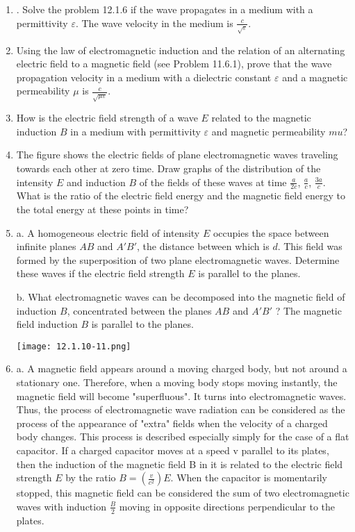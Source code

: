 \documentclass{article}
\begin{document}
\begin{enumerate}[label=12.1.\arabic*]
\item. Solve the problem 12.1.6 if the wave propagates in a medium with a permittivity $\varepsilon$. The wave velocity in the medium is $\frac{c}{\sqrt{\varepsilon}}$.

\item Using the law of electromagnetic induction and the relation of an alternating electric field to a magnetic field (see Problem 11.6.1), prove that the wave propagation velocity in a medium with a dielectric constant $\varepsilon$ and a magnetic permeability $\mu$ is $\frac{c}{\sqrt{\mu \varepsilon}}$.

\item How is the electric field strength of a wave $E$ related to the magnetic induction $B$ in a medium with permittivity $\varepsilon$ and magnetic permeability $mu$?

\item The figure shows the electric fields of plane electromagnetic waves traveling towards each other at zero time. Draw graphs of the distribution of the intensity $E$ and induction $B$ of the fields of these waves at time $\frac{a}{2c}$, $\frac{a}{c}$, $\frac{3a}{c}$. What is the ratio of the electric field energy and the magnetic field energy to the total energy at these points in time?

\item a. A homogeneous electric field of intensity $E$ occupies the space between infinite planes $AB$ and $A'B'$, the distance between which is $d$. This field was formed by the superposition of two plane electromagnetic waves. Determine these waves if the electric field strength $E$ is parallel to the planes.

b. What electromagnetic waves can be decomposed into the magnetic field of induction $B$, concentrated between the planes $AB$ and $A'B'$ ? The magnetic field induction $B$ is parallel to the planes.

\begin{center}
    \texttt{[image: 12.1.10-11.png]}
\end{center}


\item a. A magnetic field appears around a moving charged body, but not around a stationary one. Therefore, when a moving body stops moving instantly, the magnetic field will become "superfluous". It turns into electromagnetic waves. Thus, the process of electromagnetic wave radiation can be considered as the process of the appearance of "extra" fields when the velocity of a charged body changes. This process is described especially simply for the case of a flat capacitor. If a charged capacitor moves at a speed v parallel to its plates, then the induction of the magnetic field B in it is related to the electric field strength $E$ by the ratio $B = (\frac{v}{c^2}) E$. When the capacitor is momentarily stopped, this magnetic field can be considered the sum of two electromagnetic waves with induction $\frac{B}{2}$ moving in opposite directions perpendicular to the plates.


\end{enumerate}
\end{document}
